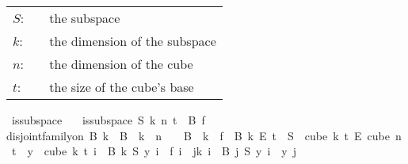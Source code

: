 \begin{isabellebody}
\begin{isamarkuptext}
\begin{tabular}{llp{8cm}}
$S$:& \isa{{\isacharparenleft}{\kern0pt}nat\ {\isasymRightarrow}\ nat{\isacharparenright}{\kern0pt}\ {\isasymRightarrow}\ {\isacharparenleft}{\kern0pt}nat\ {\isasymRightarrow}\ nat{\isacharparenright}{\kern0pt}}& the subspace\\
$k$:& \isa{nat}& the dimension of the subspace\\
$n$:& \isa{nat}& the dimension of the cube\\
$t$:& \isa{nat}& the size of the cube's base
\end{tabular}%
\end{isamarkuptext}\isamarkuptrue%
\isamarkupfalse%
\ is{\isacharunderscore}{\kern0pt}subspace\isanewline
\ \ \ {\isachardoublequoteopen}is{\isacharunderscore}{\kern0pt}subspace\ S\ k\ n\ t\ {\isasymequiv}\ {\isacharparenleft}{\kern0pt}{\isasymexists}B\ f{\isachardot}{\kern0pt}\ \isanewline
disjoint{\isacharunderscore}{\kern0pt}family{\isacharunderscore}{\kern0pt}on\ B\ {\isacharbraceleft}{\kern0pt}{\isachardot}{\kern0pt}{\isachardot}{\kern0pt}k{\isacharbraceright}{\kern0pt}\ {\isasymand}\ {\isasymUnion}{\isacharparenleft}{\kern0pt}B\ {\isacharbackquote}{\kern0pt}\ {\isacharbraceleft}{\kern0pt}{\isachardot}{\kern0pt}{\isachardot}{\kern0pt}k{\isacharbraceright}{\kern0pt}{\isacharparenright}{\kern0pt}\ {\isacharequal}{\kern0pt}\ {\isacharbraceleft}{\kern0pt}{\isachardot}{\kern0pt}{\isachardot}{\kern0pt}{\isacharless}{\kern0pt}n{\isacharbraceright}{\kern0pt}\ {\isasymand}\ {\isacharparenleft}{\kern0pt}{\isacharbraceleft}{\kern0pt}{\isacharbraceright}{\kern0pt}\ {\isasymnotin}\ B\ {\isacharbackquote}{\kern0pt}\ {\isacharbraceleft}{\kern0pt}{\isachardot}{\kern0pt}{\isachardot}{\kern0pt}{\isacharless}{\kern0pt}k{\isacharbraceright}{\kern0pt}{\isacharparenright}{\kern0pt}\ {\isasymand}\ f\ {\isasymin}\ {\isacharparenleft}{\kern0pt}B\ k{\isacharparenright}{\kern0pt}\ {\isasymrightarrow}\isactrlsub E\ {\isacharbraceleft}{\kern0pt}{\isachardot}{\kern0pt}{\isachardot}{\kern0pt}{\isacharless}{\kern0pt}t{\isacharbraceright}{\kern0pt}\ {\isasymand}\ S\ {\isasymin}\ {\isacharparenleft}{\kern0pt}cube\ k\ t{\isacharparenright}{\kern0pt}\ {\isasymrightarrow}\isactrlsub E\ {\isacharparenleft}{\kern0pt}cube\ n\ t{\isacharparenright}{\kern0pt}\ {\isasymand}\ {\isacharparenleft}{\kern0pt}{\isasymforall}y\ {\isasymin}\ cube\ k\ t{\isachardot}{\kern0pt}\ {\isacharparenleft}{\kern0pt}{\isasymforall}i\ {\isasymin}\ B\ k{\isachardot}{\kern0pt}\ S\ y\ i\ {\isacharequal}{\kern0pt}\ f\ i{\isacharparenright}{\kern0pt}\ {\isasymand}\ {\isacharparenleft}{\kern0pt}{\isasymforall}j{\isacharless}{\kern0pt}k{\isachardot}{\kern0pt}\ {\isasymforall}i\ {\isasymin}\ B\ j{\isachardot}{\kern0pt}\ {\isacharparenleft}{\kern0pt}S\ y{\isacharparenright}{\kern0pt}\ i\ {\isacharequal}{\kern0pt}\ y\ j{\isacharparenright}{\kern0pt}{\isacharparenright}{\kern0pt}{\isacharparenright}{\kern0pt}{\isachardoublequoteclose}%

\end{isabellebody}
